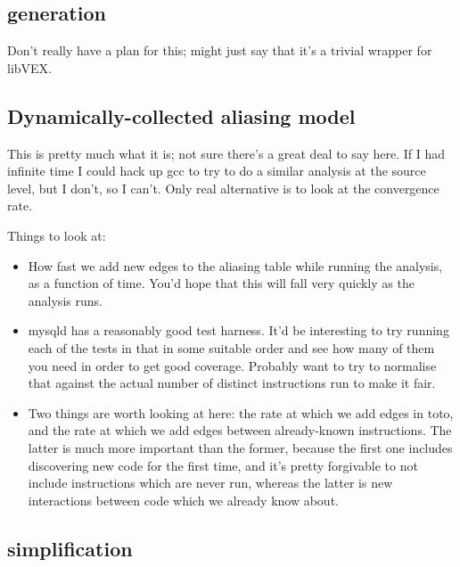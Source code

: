 
\subsection{\StateMachine generation}

Don't really have a plan for this; might just say that it's a trivial
wrapper for libVEX.

\subsection{Dynamically-collected aliasing model}

This is pretty much what it is; not sure there's a great deal to say
here.  If I had infinite time I could hack up gcc to try to do a
similar analysis at the source level, but I don't, so I can't.  Only
real alternative is to look at the convergence rate.

Things to look at:

\begin{itemize}
\item How fast we add new edges to the aliasing table while running
  the analysis, as a function of time.  You'd hope that this will fall
  very quickly as the analysis runs.
\item mysqld has a reasonably good test harness.  It'd be interesting
  to try running each of the tests in that in some suitable order and
  see how many of them you need in order to get good coverage.
  Probably want to try to normalise that against the actual number of
  distinct instructions run to make it fair.
\item Two things are worth looking at here: the rate at which we add
  edges in toto, and the rate at which we add edges between
  already-known instructions.  The latter is much more important than
  the former, because the first one includes discovering new code for
  the first time, and it's pretty forgivable to not include
  instructions which are never run, whereas the latter is new
  interactions between code which we already know about.
\end{itemize}

\subsection{\StateMachine simplification}

